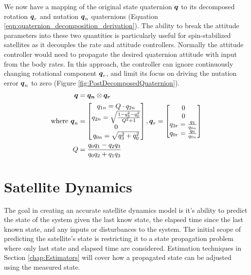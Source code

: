 We now have a mapping of the original state quaternion $\boldsymbol{q}$ to its decomposed rotation $\boldsymbol{q}_r$ and nutation $\boldsymbol{q}_n$ quaternions (Equation \ref{eqn:quaternion_decomposition_derivation}).  The ability to break the attitude parameters into these two quantities is particularly useful for spin-stabilized satellites as it decouples the rate and attitude controllers.  Normally the attitude controller would need to propagate the desired quaternion attitude with input from the body rates. In this approach, the controller can ignore continuously changing rotational component $\boldsymbol{q}_r$, and limit its focus on driving the nutation error $\boldsymbol{q}_n$ to zero (Figure \ref{fig:PostDecomposedQuaternion}).
\begin{equation}
  \begin{aligned}
    \boldsymbol{q} &= \boldsymbol{q_n} \otimes \boldsymbol{q_r} \\
    \text{where } \boldsymbol{q}_n &= \begin{bmatrix} q_{1n} = Q \cdot q_{2n} \\ q_{2n} = \sqrt{ \frac{1  - q_3^2 - q_0^2}{Q^2 + 1} } \\ 0 \\ q_{0n} = \sqrt{q_3^2 + q_0^2} \end{bmatrix} , \boldsymbol{q}_r = \begin{bmatrix} 0 \\ 0 \\ q_{3r} = \frac{q_3}{q_{0n}} \\ q_{0r} = \frac{q_0}{q_{0n}} \end{bmatrix} \\
    Q &= \frac{q_{0}q_{1} - q_{2}q_{3}}{q_{0}q_{2} + q_{1}q_{3}}
  \end{aligned}
  \label{eqn:quaternion_decomposition_derivation}
\end{equation}


\section{Satellite Dynamics}
\label{sec:SatelliteDynamics}

The goal in creating an accurate satellite dynamics model is it's ability to predict the state of the system given the last know state, the elapsed time since the last known state, and any inputs or disturbances to the system.  The initial scope of predicting the satellite's state is restricting it to a state propagation problem where only last state and elapsed time are considered.  Estimation techniques in Section \ref{chap:Estimators} will cover how a propagated state can be adjusted using the measured state.

